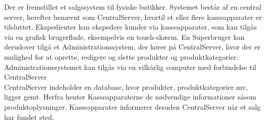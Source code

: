 Der er fremstillet et salgssystem til fysiske butikker. Systemet består af en central server, herefter benævnt som CentralServer, hvortil et eller flere kasseapparater er tilsluttet. Ekspedienter kan ekspedere kunder via kasseapparater, som kan tilgås via en grafisk brugerflade, eksempelvis en touch-skærm. En Superbruger kan derudover tilgå et Administrationssystem, der kører på CentralServer, hvor der er mulighed for at oprette, redigere og slette produkter og produktkategorier. Administrationssystemet kan tilgås via en vilkårlig computer med forbindelse til CentralServer\\

CentralServer indeholder en database, hvor produkter, produktkategorier mv, ligger gemt. Herfra henter Kasseapparaterne de nødvendige informationer såsom produktoplysninger. Kasseapparater informerer desuden CentralServer når et salg har fundet sted.